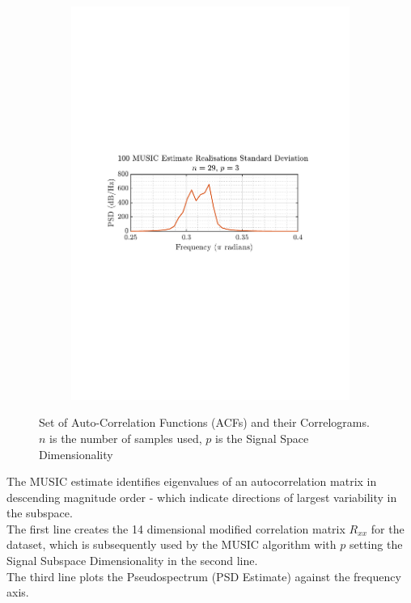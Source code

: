 \documentclass[12pt]{article}
\begin{document}
\begin{figure}[H]
\begin{subfigure}{0.49\textwidth}
			\includegraphics[trim={2.2cm 11.2cm 3.15cm  11.2cm}, clip, width=\textwidth]{../MATLAB/figures/q1_3e_fig06.pdf} 
		\end{subfigure}
		\captionsetup{justification=centering}
		\caption{Set of Auto-Correlation Functions (ACFs) and their Correlograms. \\ $n$ is the number of samples used, $p$ is the Signal Space Dimensionality}
		\label{fig: 1-3e}
	\end{figure}

	The MUSIC estimate identifies eigenvalues of an autocorrelation matrix in descending magnitude order - which indicate directions of largest variability in the subspace. \\
	The first line creates the 14 dimensional modified correlation matrix $R_{xx}$ for the dataset, which is subsequently used by the MUSIC algorithm with $p$ setting the Signal Subspace Dimensionality in the second line. \\
	The third line plots the Pseudospectrum (PSD Estimate) against the frequency axis. \\
	
\end{document}
